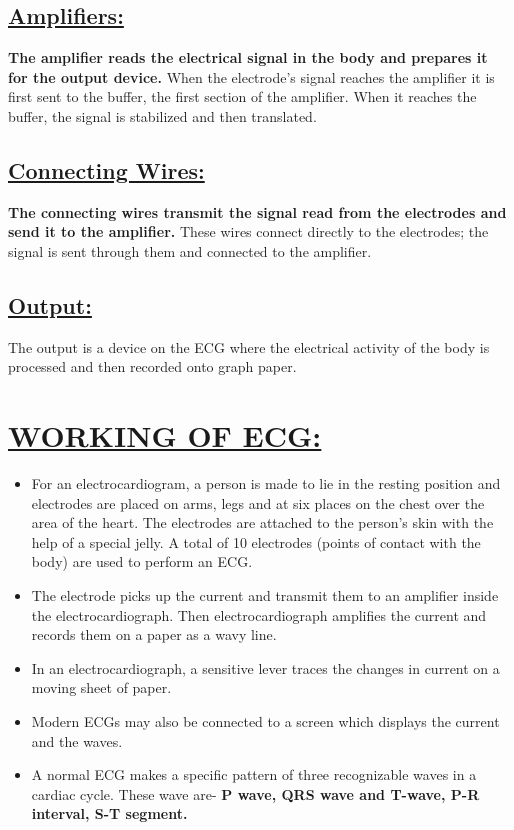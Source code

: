 \documentclass[12pt]{article}
\begin{document}
\subsection{\underline{Amplifiers:}}
\textbf{The amplifier reads the electrical signal in the body and prepares it for the output device.} When the electrode's signal reaches the amplifier it is first sent to the buffer, the first section of the amplifier. When it reaches the buffer, the signal is stabilized and then translated.
\subsection{\underline{Connecting Wires:}}
\textbf{The connecting wires transmit the signal read from the electrodes and send it to the amplifier.} These wires connect directly to the electrodes; the signal is sent through them and connected to the amplifier.
\subsection{\underline{Output:}}
The output is a device on the ECG where the electrical activity of the body is processed and then recorded onto graph paper.
\section{\underline{WORKING OF ECG:}}
\begin{itemize}
\item For an electrocardiogram, a person is made to lie in the resting position and electrodes are placed on arms, legs and at six places on the chest over the area of the heart. The electrodes are attached to the person’s skin with the help of a special jelly. A total of 10 electrodes (points of contact with the body) are used to perform an ECG.
\item The electrode picks up the current and transmit them to an amplifier inside the electrocardiograph. Then electrocardiograph amplifies the current and records them on a paper as a wavy line.
\item In an electrocardiograph, a sensitive lever traces the changes in current on a moving sheet of paper.
\item Modern ECGs may also be connected to a screen which displays the current and the waves.
\item A normal ECG makes a specific pattern of three recognizable waves in a cardiac cycle. These wave are- \textbf{P wave, QRS wave and T-wave, P-R interval, S-T segment.}
\end{itemize}
\end{document}
